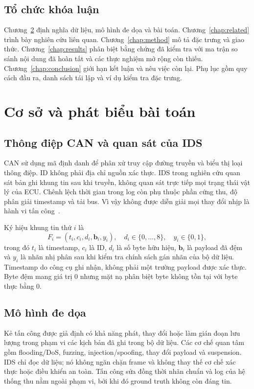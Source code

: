 \documentclass[12pt,a4paper,oneside,openany]{extbook}
\begin{document}
\section{Tổ chức khóa luận}
Chương~\ref{chap:background} định nghĩa dữ liệu, mô hình đe dọa và bài toán. Chương~\ref{chap:related} trình bày nghiên cứu liên quan. Chương~\ref{chap:method} mô tả đặc trưng và giao thức. Chương~\ref{chap:results} phân biệt bằng chứng đã kiểm tra với ma trận so sánh nội dung đã hoàn tất và các thực nghiệm mở rộng còn thiếu. Chương~\ref{chap:conclusion} giới hạn kết luận và nêu việc còn lại. Phụ lục gồm quy cách đầu ra, danh sách tái lập và ví dụ kiểm tra đặc trưng.

\chapter{Cơ sở và phát biểu bài toán}\label{chap:background}
\section{Thông điệp CAN và quan sát của IDS}
CAN sử dụng mã định danh để phân xử truy cập đường truyền và biểu thị loại thông điệp. ID không phải địa chỉ nguồn xác thực. IDS trong nghiên cứu quan sát bản ghi khung tin sau khi truyền, không quan sát trực tiếp mọi trạng thái vật lý của ECU. Chênh lệch thời gian trong log còn phụ thuộc phần cứng thu, độ phân giải timestamp và tải bus. Vì vậy không được diễn giải mọi thay đổi nhịp là hành vi tấn công~\cite{bozdal2020evaluation,verma2024road}.

Ký hiệu khung tin thứ $i$ là
\begin{equation}
F_i=(t_i,c_i,d_i,\mathbf{b}_i,y_i),\quad d_i\in\{0,\ldots,8\},\quad y_i\in\{0,1\},
\end{equation}
trong đó $t_i$ là timestamp, $c_i$ là ID, $d_i$ là số byte hữu hiệu, $\mathbf{b}_i$ là payload đã đệm và $y_i$ là nhãn nhị phân sau khi kiểm tra chính sách gán nhãn của bộ dữ liệu. Timestamp do công cụ ghi nhận, không phải một trường payload được xác thực. Byte đệm mang giá trị 0 nhưng mặt nạ phân biệt byte không tồn tại với byte thực bằng 0.

\section{Mô hình đe dọa}
Kẻ tấn công được giả định có khả năng phát, thay đổi hoặc làm gián đoạn lưu lượng trong phạm vi các kịch bản đã ghi trong bộ dữ liệu. Các cơ chế quan tâm gồm flooding/DoS, fuzzing, injection/spoofing, thay đổi payload và suspension. IDS chỉ đọc dữ liệu; nó không ngăn chặn frame và không thay thế cơ chế xác thực hoặc điều khiển an toàn. Tấn công sửa đồng thời nhãn chuẩn và log của hệ thống thu nằm ngoài phạm vi, bởi khi đó ground truth không còn đáng tin.
\end{document}
